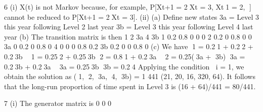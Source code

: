\documentclass[a4paper,12pt]{article}
\begin{document}
\begin{enumerate}
6 (i) {X(t)} is not Markov because, for example, P[Xt+1 = 2Xt = 3, Xt1 = 2, ]
cannot be reduced to P[Xt+1 = 2Xt = 3].
(ii) (a) Define new states
3a = Level 3 this year following Level 2 last year
3b = Level 3 this year following Level 4 last year
(b) The transition matrix is then
1 2 3a 4 3b
1 0.2 0.8 0 0 0
2 0.2 0 0.8 0 0
3a 0 0.2 0 0.8 0
4 0 0 0 0.8 0.2
3b 0.2 0 0 0.8 0
(c) We have
1 = 0.21 + 0.22 + 0.23b  1 = 0.252 + 0.253b
2 = 0.81 + 0.23a  2 = 0.25(3a + 3b)
3a = 0.23b + 0.23a  3a = 0.253b
3b = 0.24
Applying the condition i = 1, we obtain the solution as
(1, 2, 3a, 4, 3b) = 1
441
(21, 20, 16, 320, 64).
It follows that the long-run proportion of time spent in Level 3 is
(16 + 64)/441 = 80/441.

7 (i) The generator matrix is
0 0 0
    
    	 	  
 


\end{enumerate}
\end{document}
